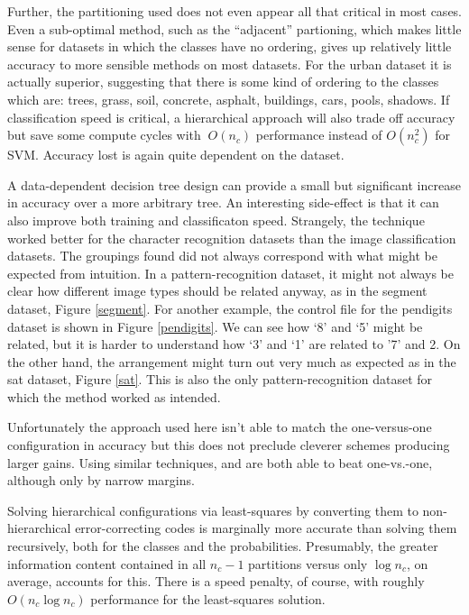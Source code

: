Further, the partitioning used does not even appear all that
critical in most cases.
Even a sub-optimal method, such as the ``adjacent'' partioning, which makes
little sense for datasets in which the classes have no ordering,
gives up relatively little accuracy to more sensible methods on most datasets.
For the urban dataset it is actually superior, suggesting that there is
some kind of ordering to the classes which are: trees, grass, soil, concrete,
asphalt, buildings, cars, pools, shadows.
If classification speed is critical, a hierarchical approach will  
also trade off accuracy but save some compute cycles with 
$~O(n_c)$ performance instead of $O(n_c^2)$ for SVM.
Accuracy lost is again quite dependent on the dataset.

A data-dependent decision tree design can provide a small but significant
increase in accuracy over a more arbitrary tree.
An interesting side-effect is
that it can also improve both training and classificaton speed.
Strangely, the technique worked better for the character recognition datasets than
the image classification datasets.
The groupings found did not always correspond with what might be
expected from intuition.
In a pattern-recognition dataset, it might not always be clear  
how different image types should be related anyway, as in
the segment dataset, Figure \ref{segment}.
For another example, the control file for the pendigits dataset is shown in Figure \ref{pendigits}.
We can see how `8' and `5' might be related, but it is harder to
understand how `3' and `1' are related to '7' and 2.
On the other hand, the arrangement might turn out very much as
expected as in the sat dataset, Figure \ref{sat}.
This is also the only pattern-recognition dataset for which the method 
worked as intended.

Unfortunately the approach used here isn't able to match the one-versus-one 
configuration in accuracy but
this does not preclude cleverer schemes producing larger gains.
Using similar techniques, \citet{Benabdeslem_Bennani2006} and \citet{Zhou_etal2008} are both able to beat one-vs.-one, although only by narrow margins.

Solving hierarchical configurations via least-squares by
converting them to non-hierarchical error-correcting codes is marginally more
accurate than solving them recursively, 
both for the classes and the probabilities.
Presumably, the greater information content contained in all $n_c-1$ partitions
versus only $\log n_c$, on average, accounts for this.
There is a speed penalty, of course, with roughly $O(n_c \log n_c)$ performance 
for the least-squares solution.

